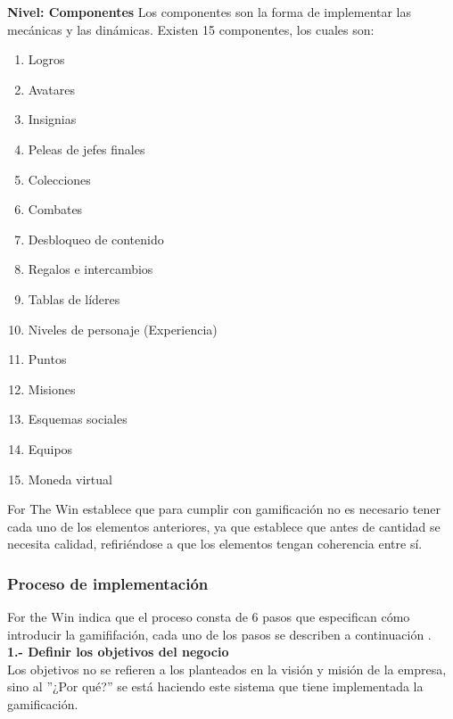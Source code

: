         \noindent\textbf{Nivel: Componentes} Los componentes son la forma de implementar las mecánicas y las dinámicas. Existen 15 componentes, los cuales son:
        
    \begin{multicols}{2}
        \begin{enumerate}
            \item Logros
            \item Avatares
            \item Insignias
            \item Peleas de jefes finales
            \item Colecciones
            \item Combates
            \item Desbloqueo de contenido
            \item Regalos e intercambios
            \item Tablas de líderes
            \item Niveles de personaje (Experiencia)
            \item Puntos
            \item Misiones
            \item Esquemas sociales
            \item Equipos
            \item Moneda virtual
        \end{enumerate}
    \end{multicols}
    
    
    \noindent  For The Win establece que para cumplir con gamificación no es necesario tener cada uno de los elementos anteriores, ya que establece que antes de cantidad se necesita calidad, refiriéndose a que los elementos tengan coherencia entre sí.
    
    \subsubsection{ Proceso de implementación}
    
    For the Win indica que el proceso consta de 6 pasos que especifican cómo introducir la gamififación, cada uno de los pasos se describen a continuación \cite[pp. 60-70]{ForTheWin}.\\
    
    \noindent \textbf{1.- Definir los objetivos del negocio}\\
    
    \noindent Los objetivos no se refieren a los planteados en la visión y misión de la empresa, sino al ''¿Por qué?'' se está haciendo este sistema que tiene implementada la gamificación.\\
    
